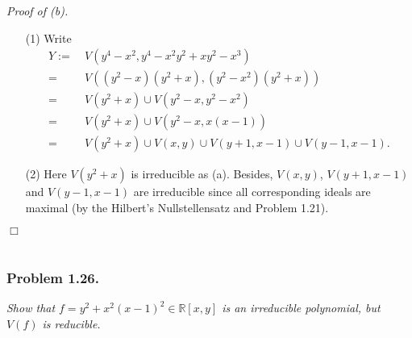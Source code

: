 \documentclass{article}
\begin{document}
\emph{Proof of (b).}
\begin{enumerate}
\item[(1)]
  Write
  \begin{align*}
    Y
    :=& \: V(y^4 - x^2, y^4 - x^2 y^2 + xy^2 - x^3) \\
    =& \: V((y^2 - x)(y^2 + x), (y^2 - x^2)(y^2 + x)) \\
    =& \: V(y^2 + x) \cup V(y^2 - x, y^2 - x^2) \\
    =& \: V(y^2 + x) \cup V(y^2 - x, x(x - 1)) \\
    =& \: V(y^2 + x) \cup V(x, y) \cup V(y + 1, x - 1) \cup V(y - 1, x - 1).
  \end{align*}

\item[(2)]
  Here $V(y^2 + x)$ is irreducible as (a).
  Besides,
  $V(x, y)$, $V(y + 1, x - 1)$ and $V(y - 1, x - 1)$ are irreducible
  since all corresponding ideals are maximal
  (by the Hilbert's Nullstellensatz and Problem 1.21).
\end{enumerate}
$\Box$ \\\\






\subsubsection*{Problem 1.26.}
\emph{Show that $f = y^2 + x^2(x-1)^2 \in \mathbb{R}[x,y]$ is an irreducible polynomial,
but $V(f)$ is reducible.} \\
\end{document}
